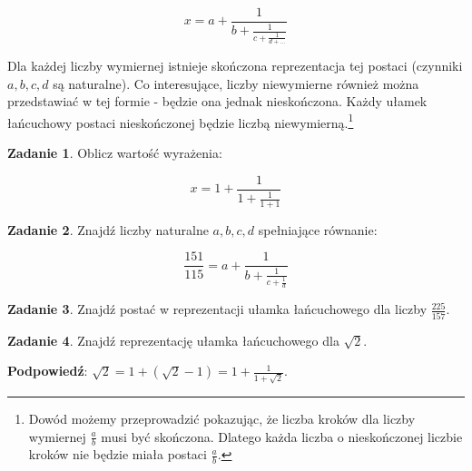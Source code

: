 \documentclass[11pt]{article}
\theoremstyle{definition}
\newtheorem{zad}{Zadanie}
\begin{document}
$$ x = a + \frac{1}{b+\frac{1}{c+\frac1{d+...}}}$$

Dla każdej liczby wymiernej istnieje skończona reprezentacja tej postaci (czynniki $a,b,c,d$ są naturalne). Co interesujące, liczby niewymierne również można przedstawiać w tej formie - będzie ona jednak nieskończona. Każdy ułamek łańcuchowy postaci nieskończonej będzie liczbą niewymierną.\footnote{Dowód możemy przeprowadzić pokazując, że liczba kroków dla liczby wymiernej $\frac{a}{b}$ musi być skończona. Dlatego każda liczba o nieskończonej liczbie kroków nie będzie miała postaci $\frac ab$.}

\begin{zad}
Oblicz wartość wyrażenia:

$$x = 1+\frac1{1+\frac1{1+1}}$$
\end{zad}

\begin{zad}
Znajdź liczby naturalne $a,b,c,d$ spełniające równanie:

$$\frac{151}{115}=a+\frac1{b+\frac1{c+\frac1d}}$$
\end{zad}
\begin{zad}
Znajdź postać w reprezentacji ułamka łańcuchowego dla liczby $\frac{225}{157}$.
\end{zad}

\begin{zad}
Znajdź reprezentację ułamka łańcuchowego dla $\sqrt{2}$.

\textbf{Podpowiedź}: $\sqrt{2} = 1 + (\sqrt{2}-1) = 1+\frac1{1+\sqrt{2}}$.
\end{zad}
\end{document}
